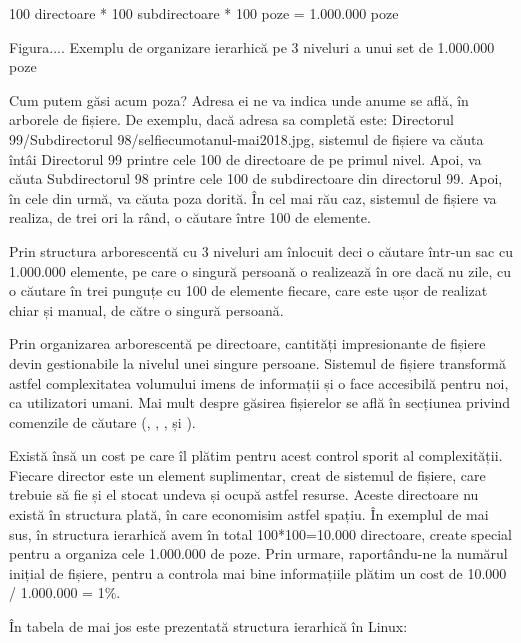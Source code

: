 100 directoare * 100 subdirectoare * 100 poze = 1.000.000 poze

Figura.... Exemplu de organizare ierarhică pe 3 niveluri a unui set de 1.000.000
poze

Cum putem găsi acum poza? Adresa ei ne va indica unde anume se află, în arborele
de fișiere. De exemplu, dacă adresa sa completă este: Directorul
99/Subdirectorul 98/selfiecumotanul-mai2018.jpg, sistemul de fișiere va căuta
întâi Directorul 99 printre cele 100 de directoare de pe primul nivel.  Apoi, va
căuta Subdirectorul 98 printre cele 100 de subdirectoare din directorul 99.
Apoi, în cele din urmă, va căuta poza dorită. În cel mai rău caz, sistemul de
fișiere va realiza, de trei ori la rând, o căutare între 100 de elemente.

Prin structura arborescentă cu 3 niveluri am înlocuit deci o căutare într-un sac
cu 1.000.000 elemente, pe care o singură persoană o realizează în ore dacă nu
zile, cu o căutare în trei punguțe cu 100 de elemente fiecare, care este ușor de
realizat chiar și manual, de către o singură persoană.

Prin organizarea arborescentă pe directoare, cantități impresionante de fișiere
devin gestionabile la nivelul unei singure persoane. Sistemul de fișiere
transformă astfel complexitatea volumului imens de informații și o face
accesibilă pentru noi, ca utilizatori umani. Mai mult despre găsirea fișierelor
se află în secțiunea privind comenzile de căutare (, ,
,  și ).

Există însă un cost pe care îl plătim pentru acest control sporit al
complexității. Fiecare director este un element suplimentar, creat de sistemul
de fișiere, care trebuie să fie și el stocat undeva și ocupă astfel resurse.
Aceste directoare nu există în structura plată, în care economisim astfel
spațiu. În exemplul de mai sus, în structura ierarhică avem în total
100*100=10.000 directoare, create special pentru a organiza cele 1.000.000 de
poze. Prin urmare, raportându-ne la numărul inițial de fișiere, pentru a
controla mai bine informațiile plătim un cost de 10.000 / 1.000.000 = 1\%.


În tabela de mai jos este prezentată structura ierarhică în Linux:


